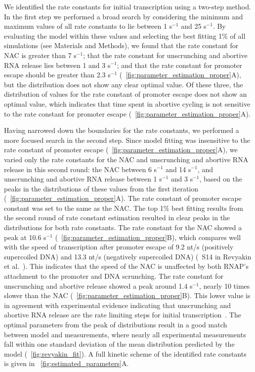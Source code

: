 %

We identified the rate constants for initial transcription using a two-step
method. In the first step we performed a broad search by considering the
minimum and maximum values of all rate constants to lie between 1 s$^{-1}$ and
25 s$^{-1}$. By evaluating the model within these values and selecting the
best fitting 1\% of all simulations (see Materials and Methods), we found that
the rate constant for NAC is greater than 7 s$^{-1}$; that the rate
constant for unscrunching and abortive RNA release lies between 1 and 3
s$^{-1}$; and that the rate constant for promoter escape should be greater
than 2.3 s$^{-1}$ (\FIG~\ref{fig:parameter_estimation_proper}A), but the
distribution does not show any clear optimal value. Of these three, the
distribution of values for the rate constant of promoter escape does not
show an optimal value, which indicates that time spent in abortive cycling is
not sensitive to the rate constant for promoter escape
(\FIG~\ref{fig:parameter_estimation_proper}A).

Having narrowed down the boundaries for the rate constants, we performed a
more focused search in the second step. Since model fitting was insensitive to
the rate constant of promoter escape
(\FIG~\ref{fig:parameter_estimation_proper}A), we varied only the rate
constants for the NAC and unscrunching and abortive RNA release in this second
round: the NAC between 6 s$^{-1}$ and 14 s$^{-1}$, and unscrunching and
abortive RNA release between 1 s$^{-1}$ and 3 s$^{-1}$, based on the peaks in
the distributions of these values from the first iteration
(\FIG~\ref{fig:parameter_estimation_proper}A). The rate constant of promoter
escape constant was set to the same as the NAC. The top 1\% best fitting
results from the second round of rate constant estimation resulted in clear
peaks in the distributions for both rate constants. The rate constant for the
NAC showed a peak at 10.6 s$^{-1}$
(\FIG~\ref{fig:parameter_estimation_proper}B), which compares well with the
speed of transcription after promoter escape of 9.2 nt/s (positively
  supercoiled DNA) and 13.3 nt/s (negatively supercoiled DNA) (\FIG~S14 in
Revyakin et al.\ \cite{revyakin_abortive_2006}). This indicates that the speed
of the NAC is unaffected by both RNAP's attachment to the promoter and DNA
scrunching. The rate constant for unscrunching and abortive release showed a
peak around 1.4 s$^{-1}$, nearly 10 times slower than the NAC
(\FIG~\ref{fig:parameter_estimation_proper}B). This lower value is in
agreement with experimental evidence indicating that unscrunching and abortive
RNA release are the rate limiting steps for initial
transcription~\cite{revyakin_abortive_2006, margeat_direct_2006}. The optimal
parameters from the peak of distributions result in a good match between model
and measurements, where nearly all experimental measurements fall within one
standard deviation of the mean distribution predicted by the model
(\FIG~\ref{fig:revyakin_fit}). A full kinetic scheme of the identified rate
constants is given in \FIG~\ref{fig:estimated_parameters}A.

